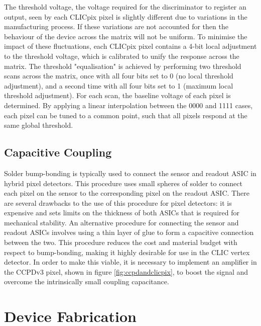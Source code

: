 The threshold voltage, the voltage required for the discriminator to register an output, seen by each CLICpix pixel is slightly different due to variations in the manufacturing process.  If these variations are not accounted for then the behaviour of the device across the matrix will not be uniform.  To minimise the impact of these fluctuations, each CLICpix pixel contains a 4-bit local adjustment to the threshold voltage, which is calibrated to unify the response across the matrix.  The threshold "equalisation" is achieved by performing two threshold scans across the matrix, once with all four bits set to 0 (no local threshold adjustment), and a second time with all four bits set to 1 (maximum local threshold adjustment).  For each scan, the baseline voltage of each pixel is determined. By applying a linear interpolation between the 0000 and 1111 cases, each pixel can be tuned to a common point, such that all pixels respond at the same global threshold.


\subsection{Capacitive Coupling}

Solder bump-bonding is typically used to connect the sensor and readout ASIC in hybrid pixel detectors.  This procedure uses small spheres of solder to connect each pixel on the sensor to the corresponding pixel on the readout ASIC.  There are several drawbacks to the use of this procedure for pixel detectors: it is expensive and sets limits on the thickness of both ASICs that is required for mechanical stability.  An alternative procedure for connecting the sensor and readout ASICs involves using a thin layer of glue to form a capacitive connection between the two.  This procedure reduces the cost and material budget with respect to bump-bonding, making it highly desirable for use in the CLIC vertex detector. In order to make this viable, it is necessary to implement an amplifier in the CCPDv3 pixel, shown in figure \ref{fig:ccpdandclicpix}, to boost the signal and overcome the intrinsically small coupling capacitance. 


\section{Device Fabrication}


